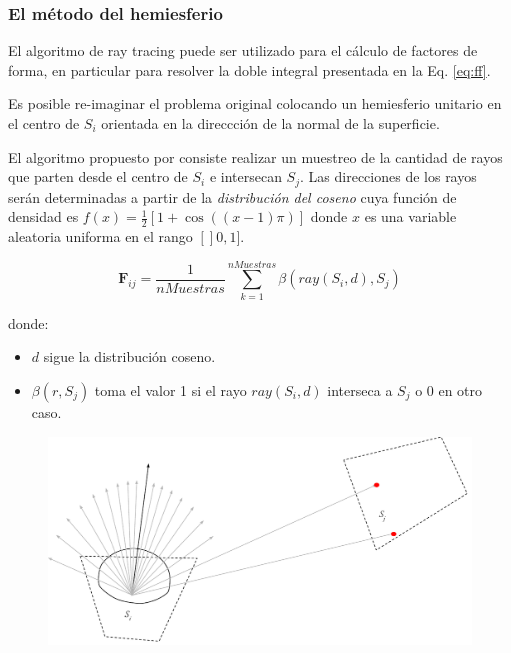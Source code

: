 \subsubsection{El método del hemiesferio}

El algoritmo de ray tracing puede ser utilizado para el cálculo de factores de forma, en particular para resolver la doble integral presentada en la Eq. \eqref{eq:ff}.

Es posible re-imaginar el problema original colocando un hemiesferio unitario en el centro de $S_{i}$ orientada en la direccción de la normal de la superficie.

El algoritmo propuesto por \citeauthor{Malley}  consiste realizar un muestreo de la cantidad de  rayos que parten desde el centro de $S_{i}$ e intersecan $S_{j}$. Las direcciones de los rayos serán determinadas a partir de la \textit{distribución del coseno} cuya función de densidad es $f(x) = \frac{1}{2}[1 + \cos((x-1)\pi)]$ donde $x$ es una variable aleatoria uniforma en el rango $[]0,1]$.

\begin{equation}
	\mathbf{F}_{ij} = \frac{1}{nMuestras} \sum_{k=1}^{nMuestras} {\beta(ray(S_{i},d), S_{j})}
	\label{eq:ffhemiesfera}
\end{equation}

donde:
	
	\begin{itemize}
		\item  $d$ sigue la distribución coseno.
		\item $\beta(r, S_{j})$ toma el valor 1 si el rayo $ray(S_{i},d)$ interseca a $S_{j}$ o $0$ en otro caso.
	\end{itemize}

\vspace{5mm}
\begin{figure}[H]
	\centering
	\includegraphics[width=\linewidth]{assets/Raytracing}
	\label{img:ff}
\end{figure}


